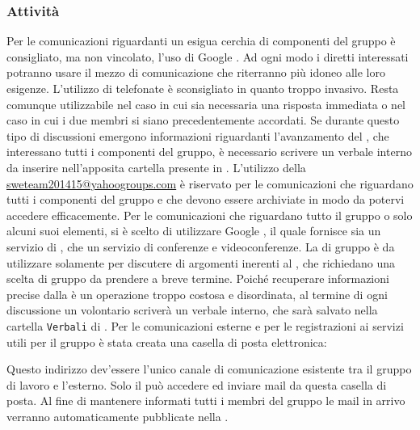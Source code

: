 \subsubsection{Attività}
Per le comunicazioni riguardanti un esigua cerchia di componenti del gruppo è consigliato, ma non vincolato, l'uso di Google . Ad ogni modo i diretti interessati potranno usare il mezzo di comunicazione che riterranno più idoneo alle loro esigenze.
L'utilizzo di telefonate è sconsigliato in quanto troppo invasivo. Resta comunque utilizzabile nel caso in cui sia necessaria una risposta immediata o nel caso in cui i due membri si siano precedentemente accordati.
Se durante questo tipo di discussioni emergono informazioni riguardanti l'avanzamento del , che interessano tutti i componenti del gruppo, è necessario scrivere un verbale interno da inserire nell'apposita cartella presente in .
L'utilizzo della  \url{sweteam201415@yahoogroups.com} è riservato per le comunicazioni che riguardano tutti i componenti del gruppo e che devono essere archiviate in modo da potervi accedere efficacemente.
Per le comunicazioni che riguardano tutto il gruppo o solo alcuni suoi elementi, si è scelto di utilizzare Google , il quale fornisce sia un servizio di , che un servizio di conferenze e videoconferenze.
La  di gruppo è da utilizzare solamente per discutere di argomenti inerenti al , che richiedano una scelta di gruppo da prendere a breve termine. Poiché recuperare informazioni precise dalla  è un operazione troppo costosa e disordinata, al termine di ogni discussione un volontario scriverà un verbale interno, che sarà salvato nella cartella \texttt{Verbali} di .
Per le comunicazioni esterne e per le registrazioni ai servizi utili per il gruppo è stata creata una casella di posta elettronica:
\begin{center}
\groupmail
\end{center}
Questo indirizzo dev'essere l'unico canale di comunicazione esistente tra il gruppo di lavoro e l'esterno.
Solo il \rRP può accedere ed inviare mail da questa casella di posta.
Al fine di mantenere informati tutti i membri del gruppo le mail in arrivo verranno automaticamente pubblicate nella .

